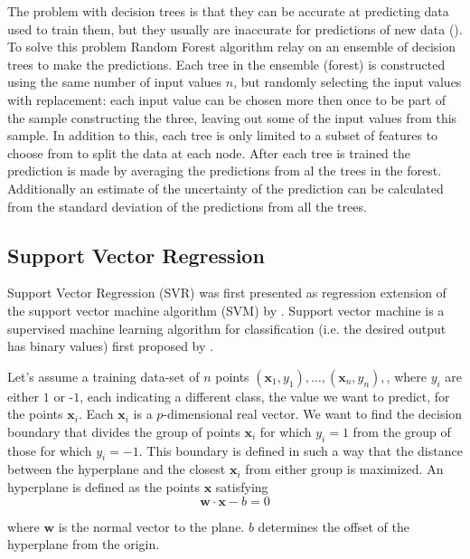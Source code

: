 The problem with decision trees is that they can be accurate at predicting data used to train them, but they usually are inaccurate for predictions of new data (\cite{hastie01statisticallearning}).
To solve this problem Random Forest algorithm relay on an ensemble of decision trees to make the predictions. Each tree in the ensemble (forest) is constructed using the same number of input values $n$, but randomly selecting the input values with replacement: each input value can be chosen more then once to be part of the sample constructing the three, leaving out some of the input values from this sample. In addition to this, each tree is only limited to a subset of features to choose from to split the data at each node. After each tree is trained the prediction is made by averaging the predictions from al the trees in the forest. Additionally an estimate of the uncertainty of the prediction can be calculated from the standard deviation of the predictions from all the trees.



\subsection{Support Vector Regression}\label{support-vector}
Support Vector Regression (SVR) was first presented as regression extension of the support vector machine algorithm (SVM) by \citet{SVR1997}. Support vector machine is a supervised machine learning algorithm for classification (i.e. the desired output has binary values) first proposed by \citet{SVM1964}.

Let's assume a training data-set of $n$ points ${({\mathbf {x}}_{1},y_{1}),\ldots ,({\mathbf {x}}_{n},y_{n}),}$, where $y_{i}$ are either $1$ or -$1$, each indicating a different class, the value we want to predict, for the points ${\mathbf {x}}_{i}$. Each ${\mathbf {x}_{i}}$ is a $p$-dimensional real vector. We want to find the decision boundary that divides the group of points $\mathbf {x}_{i}$ for which $y_{i}=1$ from the group of those for which $y_{i}=-1$. This boundary is defined in such a way that the distance between the hyperplane and the closest ${\mathbf {x}}_{i}$ from either group is maximized.
An hyperplane is defined as the points ${\mathbf {x}}$ satisfying 
\begin{equation}\label{eq:svm}
\mathbf {w}\cdot \mathbf {x}-b=0
\end{equation}

where $\mathbf {w}$ is the normal vector to the plane. $b$ determines the offset of the hyperplane from the origin.

